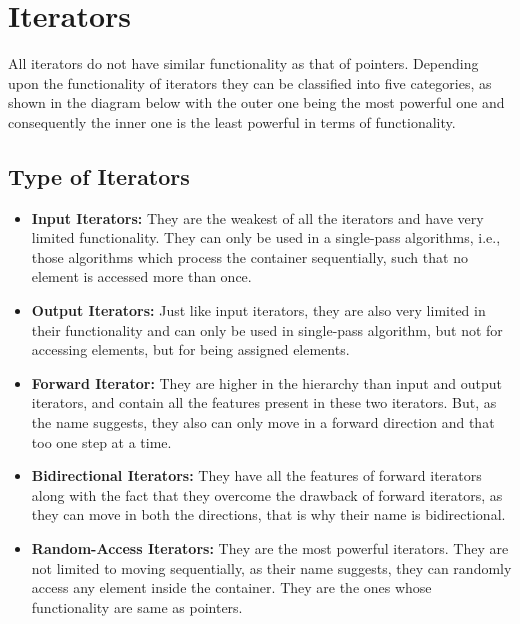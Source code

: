 \documentclass{report}
\begin{document}
    \section{\LARGE Iterators}
    \bigbreak \noindent 
        \begin{concept}
        All iterators do not have similar functionality as that of pointers. Depending upon the functionality of iterators they can be classified into five categories, as shown in the diagram below with the outer one being the most powerful one and consequently the inner one is the least powerful in terms of functionality.
    \end{concept}
    \begin{figure}[ht]
        \centering
        \label{fig:iterator}
    \end{figure}
    \bigbreak \noindent 
    \subsection{Type of Iterators}
    \bigbreak \noindent 
    \begin{itemize}
        \item \textbf{Input Iterators:} They are the weakest of all the iterators and have very limited functionality. They can only be used in a single-pass algorithms, i.e., those algorithms which process the container sequentially, such that no element is accessed more than once.
        \item \textbf{Output Iterators:} Just like input iterators, they are also very limited in their functionality and can only be used in single-pass algorithm, but not for accessing elements, but for being assigned elements.
        \item \textbf{Forward Iterator:} They are higher in the hierarchy than input and output iterators, and contain all the features present in these two iterators. But, as the name suggests, they also can only move in a forward direction and that too one step at a time.
        \item \textbf{Bidirectional Iterators:} They have all the features of forward iterators along with the fact that they overcome the drawback of forward iterators, as they can move in both the directions, that is why their name is bidirectional.
        \item \textbf{Random-Access Iterators:} They are the most powerful iterators. They are not limited to moving sequentially, as their name suggests, they can randomly access any element inside the container. They are the ones whose functionality are same as pointers.
    \end{itemize}
    \smallbreak \noindent
    \begin{figure}[ht]
        \centering
        \label{fig:it2}
    \end{figure}
\end{document}
